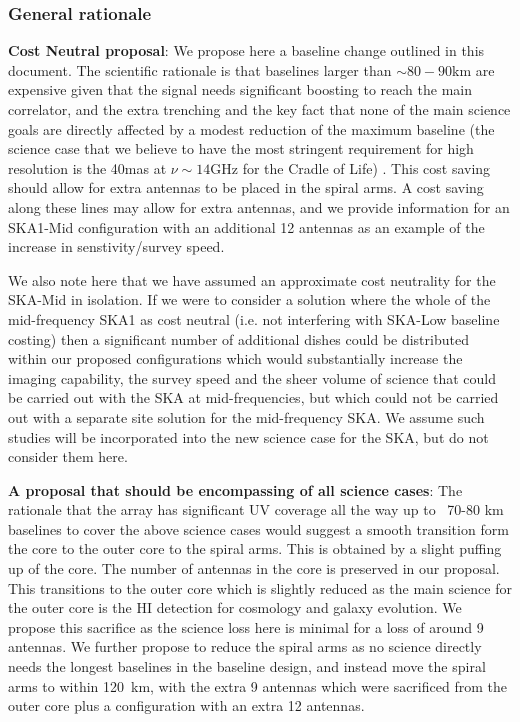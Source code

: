 \documentclass[sfheadings,a4paper,times,9pt,floats,floatfix]{article}
\begin{document}
\subsubsection{General rationale}

{\bf Cost Neutral proposal}: We propose here a baseline change outlined in this document. The scientific rationale is that
baselines larger than $\sim 80-90$km are expensive given that the signal needs significant boosting to
reach the main correlator, and the extra trenching and the key fact
that none of the main science goals are directly
affected by a modest reduction of the maximum baseline (the 
science case that we believe to have the most stringent requirement
for high resolution is the 40mas at $\nu\sim 14$GHz for the Cradle of Life) . This cost saving should allow for
extra antennas to be placed in the spiral arms. A cost saving along
these lines may allow for extra antennas, and we provide information
for an SKA1-Mid configuration with an additional 12 antennas as an
example of the increase in senstivity/survey speed. 

We also note here that we have assumed an approximate cost neutrality
for the SKA-Mid in isolation. If we were to consider a solution where the whole of the
mid-frequency SKA1 as cost neutral (i.e. not interfering with
SKA-Low baseline costing) then a significant number of additional dishes could be distributed
within our proposed configurations which would substantially increase the imaging
capability, the survey speed and the sheer volume of science that
could be carried out with the SKA at mid-frequencies, but which could
not be carried out with a separate site solution for the mid-frequency SKA. We
assume such studies will be incorporated into the new science case for
the SKA, but do not consider them here.

{\bf A proposal that should be encompassing of all science cases}: The rationale that the array
has significant UV coverage all the way up to ~70-80 km baselines to cover the above
science cases would suggest a smooth transition form the core to the outer core to the
spiral arms. This is obtained by a slight puffing up of the core. The number of antennas in the core is preserved in our
proposal. This transitions to the outer core which is slightly reduced as the main science for
the outer core is the HI detection for cosmology and galaxy evolution. We propose this sacrifice as
the science loss here is minimal for a loss of around 9 antennas. We further propose to
reduce the spiral arms as no science directly needs the longest
baselines in the baseline design, and instead move
the spiral arms to within 120~km, with the extra 9 antennas which were sacrificed from the outer core
plus a configuration with an extra 12 antennas.
\end{document}
